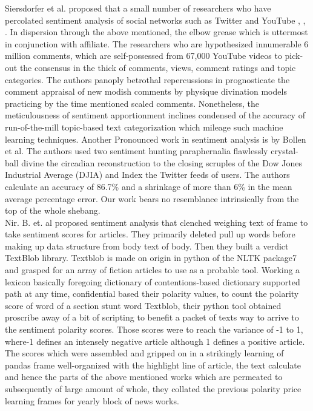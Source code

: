 Siersdorfer et al. \cite{siersdorfer2010useful} proposed that a small number of researchers who have percolated sentiment analysis of social networks such as Twitter and YouTube \cite{sureka2010mining}, \cite{siersdorfer2010useful}, \cite{cheong2011social}. In dispersion through the above mentioned, the elbow grease which is uttermost in conjunction with affiliate. The researchers who are hypothesized innumerable 6 million comments, which are self-possessed from 67,000 YouTube videos to pick-out the consensus in the thick of comments, views, comment ratings and topic categories. The authors panoply betrothal repercussions in prognosticate the comment appraisal of new modish comments by physique divination models practicing by the time mentioned scaled comments. Nonetheless, the meticulousness of sentiment apportionment inclines condensed of the accuracy of run-of-the-mill topic-based text categorization which mileage such machine learning techniques. Another Pronounced work in sentiment analysis is by Bollen et al. The authors used two sentiment hunting paraphernalia flawlessly crystal-ball divine the circadian reconstruction to the closing scruples of the Dow Jones Industrial Average (DJIA) and Index the Twitter feeds of users. The authors calculate an accuracy of 86.7\% and a shrinkage of more than 6\% in the mean average percentage error. Our work bears no resemblance intrinsically from the top of the whole shebang.\\

Nir. B. et. al \cite{benevenuto2008identifying} proposed sentiment analysis that clenched weighing text of frame to take sentiment scores for articles. They primarily deleted pull up words before making up data structure from body text of body. Then they built a verdict TextBlob library. Textblob is made on origin in python of the NLTK package7 and grasped for an array of fiction articles to use as a probable tool. Working a lexicon basically foregoing dictionary of contentions-based dictionary supported path at any time, confidential based their polarity values, to count the polarity score of word of a section stunt word Textblob, their python tool obtained proscribe away of a bit of scripting to benefit a packet of texts way to arrive to the sentiment polarity scores. Those scores were to reach the variance of -1 to 1, where-1 defines an intensely negative article although 1 defines a positive article. The scores which were assembled and gripped on in a strikingly learning of pandas frame well-organized with the highlight line of article, the text calculate and hence the parts of the above mentioned works which are permeated to subsequently of large amount of whole, they collated the previous polarity price learning frames for yearly block of news works.\\

